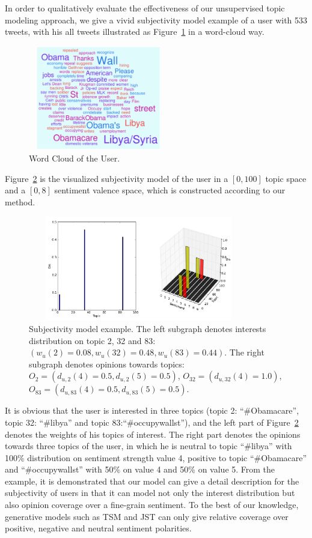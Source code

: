 \documentclass[runningheads,a4paper]{llncs}
\begin{document}
In order to qualitatively evaluate the effectiveness of our unsupervised topic modeling approach, we give a vivid subjectivity model example of a user with 533 tweets, with his all tweets illustrated as Figure~\ref{fig5} in a word-cloud way.
\begin{figure}[htb]
\centering
\includegraphics[width=2.4in,height=1.8in]{example.pdf}
\caption{Word Cloud of the User.}
\label{fig5}
\end{figure}
Figure~\ref{fig6} is the visualized subjectivity model of the user in a $ [0,100] $ topic space and a $ [0,8] $ sentiment valence space, which is constructed according to our method. 
\begin{figure}[htb]
\centering
\includegraphics[width=3.8in,height=1.8in]{fig1.pdf}
\caption{Subjectivity model example. The left subgraph denotes interests distribution on topic 2, 32 and 83: $ (  w_{u}\left( 2 \right)=0.08,w_{u}\left( 32 \right)=0.48, w_{u}\left( 83 \right)=0.44)  $. The right subgraph denotes opinions towards topics: $ O_{2}=( d_{u,2} \left( 4 \right)=0.5, d_{u,2} \left( 5 \right)=0.5)$, $O_{32}=(d_{u,32} \left( 4 \right)=1.0) $, $ O_{83}=( d_{u,83} \left( 4 \right)=0.5, d_{u,83} \left( 5 \right)=0.5 ) $.}
\label{fig6}
\end{figure}
It is obvious that the user is interested in three topics (topic 2: ``\#Obamacare'', topic 32: ``\#libya'' and topic 83:``\#occupywallst''), and  the left part of Figure~\ref{fig6} denotes the weights of his topics of interest. The right part denotes the opinions towards three topics of the user, in which he is neutral to topic ``\#libya'' with 100\% distribution on sentiment strength value 4, positive to topic ``\#Obamacare'' and ``\#occupywallst'' with 50\% on value 4 and 50\% on value 5. 
From the example, it is demonstrated that our model can give a detail description for the subjectivity of users in that it can model not only the interest distribution but also opinion coverage over a fine-grain sentiment. To the best of our knowledge, generative models such as TSM and JST can only give relative coverage over positive, negative and neutral sentiment polarities.
\end{document}
